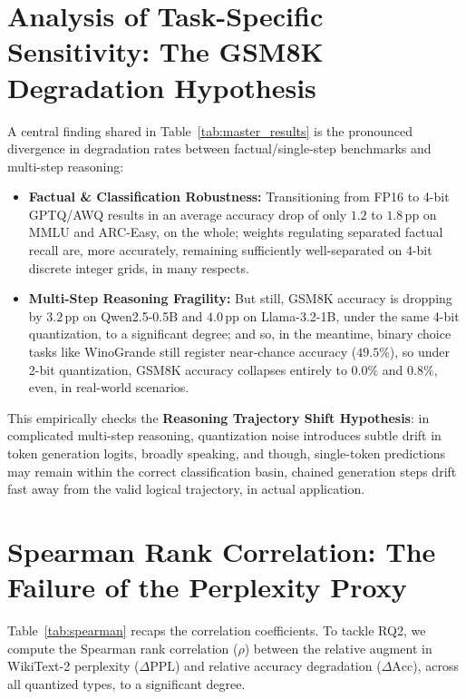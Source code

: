 \documentclass[12pt,a4paper,oneside]{report}
\begin{document}
    \section{Analysis of Task-Specific Sensitivity: The GSM8K Degradation Hypothesis}
    A central finding shared in Table~\ref{tab:master_results} is the pronounced divergence in degradation rates between factual/single-step benchmarks and multi-step reasoning:
    \begin{itemize}[leftmargin=*]
        \item \textbf{Factual & Classification Robustness:} Transitioning from FP16 to 4-bit GPTQ/AWQ results in an average accuracy drop of only $1.2$ to $1.8\,\text{pp}$ on MMLU and ARC-Easy, on the whole; weights regulating separated factual recall are, more accurately, remaining sufficiently well-separated on 4-bit discrete integer grids, in many respects.
        \item \textbf{Multi-Step Reasoning Fragility:} But still, GSM8K accuracy is dropping by $3.2\,\text{pp}$ on Qwen2.5-0.5B and $4.0\,\text{pp}$ on Llama-3.2-1B, under the same 4-bit quantization, to a significant degree; and so, in the meantime, binary choice tasks like WinoGrande still register near-chance accuracy ($49.5\%$), so under 2-bit quantization, GSM8K accuracy collapses entirely to $0.0\%$ and $0.8\%$, even, in real-world scenarios.
    \end{itemize}
    This empirically checks the \textbf{Reasoning Trajectory Shift Hypothesis}: in complicated multi-step reasoning, quantization noise introduces subtle drift in token generation logits, broadly speaking, and though, single-token predictions may remain within the correct classification basin, chained generation steps drift fast away from the valid logical trajectory, in actual application.

    \section{Spearman Rank Correlation: The Failure of the Perplexity Proxy}
    Table~\ref{tab:spearman} recaps the correlation coefficients. To tackle RQ2, we compute the Spearman rank correlation ($\rho$) between the relative augment in WikiText-2 perplexity ($\Delta\text{PPL}$) and relative accuracy degradation ($\Delta\text{Acc}$), across all quantized types, to a significant degree.
\end{document}
